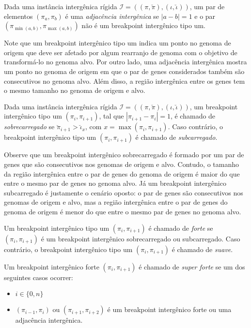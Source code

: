 \begin{definition}
  Dada uma instância intergênica rígida $\mathcal{I} = ((\pi,\breve\pi),(\iota,\breve\iota))$, um par de elementos $(\pi_{a}, \pi_{b})$ é uma \emph{adjacência intergênica} se $|a-b|=1$ e o par $(\pi_{\min(a,b)}, \pi_{\max(a,b)})$ não é um breakpoint intergênico tipo um.
\end{definition}

Note que um breakpoint intergênico tipo um indica um ponto no genoma de origem que deve ser afetado por algum rearranjo de genoma com o objetivo de transformá-lo no genoma alvo. Por outro lado, uma adjacência intergênica mostra um ponto no genoma de origem em que o par de genes considerados também são consecutivos no genoma alvo. Além disso, a região intergênica entre os genes tem o mesmo tamanho no genoma de origem e alvo.

\begin{definition}
  Dada uma instância intergênica rígida $\mathcal{I} = ((\pi,\breve\pi),(\iota,\breve\iota))$, um breakpoint intergênico tipo um $(\pi_{i}, \pi_{i+1})$, tal que $|\pi_{i+1} - \pi_{i}| = 1$, é chamado de \emph{sobrecarregado} se $\breve\pi_{i+1} > \breve\iota_{x}$, com $x = \max(\pi_{i}, \pi_{i+1})$. Caso contrário, o breakpoint intergênico tipo um $(\pi_{i}, \pi_{i+1})$ é chamado de \emph{subcarregado}.
\end{definition}

Observe que um breakpoint intergênico sobrecarregado é formado por um par de genes que são consecutivos nos genomas de origem e alvo. Contudo, o tamanho da região intergênica entre o par de genes do genoma de origem é maior do que entre o mesmo par de genes no genoma alvo. Já um breakpoint intergênico subcarregado é justamente o cenário oposto: o par de genes são consecutivos nos genomas de origem e alvo, mas a região intergênica entre o par de genes do genoma de origem é menor do que entre o mesmo par de genes no genoma alvo.

\begin{definition}
  Um breakpoint intergênico tipo um $(\pi_{i}, \pi_{i+1})$ é chamado de \emph{forte} se $(\pi_{i}, \pi_{i+1})$ é um breakpoint intergênico sobrecarregado ou subcarregado. Caso contrário, o breakpoint intergênico tipo um $(\pi_{i}, \pi_{i+1})$ é chamado de \emph{suave}.
\end{definition}

\begin{definition}
  Um breakpoint intergênico forte $(\pi_{i}, \pi_{i+1})$ é chamado de \emph{super forte} se um dos seguintes casos ocorrer:
  \begin{itemize}
    \item $i \in \{0,n\}$
    \item $(\pi_{i-1}, \pi_{i})$ ou $(\pi_{i+1}, \pi_{i+2})$ é um breakpoint intergênico forte ou uma adjacência intergênica.
  \end{itemize}
\end{definition}

